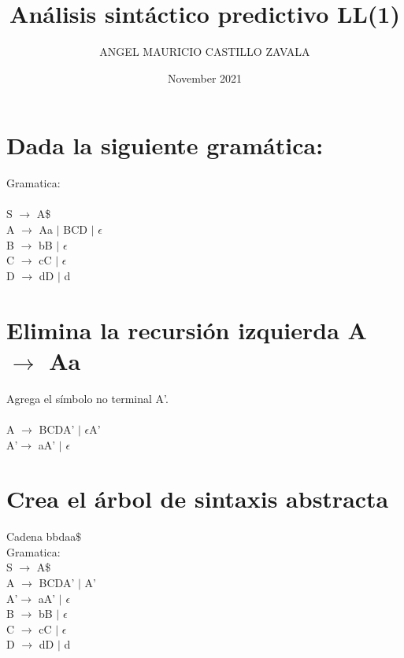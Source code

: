 \documentclass[10pt]{article}
\title{Análisis sintáctico predictivo LL(1)}
\author{ANGEL MAURICIO CASTILLO ZAVALA}
\date{November 2021}
\begin{document}
\maketitle

\section{Dada la siguiente gramática: }
Gramatica: \\\\
    S {$\rightarrow$} A\$ \\
	A {$\rightarrow$}  Aa $\mid$ BCD $\mid$ $\epsilon$ \\
	B {$\rightarrow$} bB $\mid$ $\epsilon$ \\
	C {$\rightarrow$} cC $\mid$ $\epsilon$\\
	D {$\rightarrow$} dD $\mid$ d

\section{Elimina la recursión izquierda A $\rightarrow$ Aa}
Agrega el símbolo no terminal A’.\\\\
           A $\rightarrow$ BCDA' $\mid$ $\epsilon$A'\\
          A’$\rightarrow$ aA' $\mid$ $\epsilon$ \\

\section{Crea el árbol de sintaxis abstracta}    
Cadena bbdaa$\$$\\
Gramatica:\\
S {$\rightarrow$} A\$ \\
A $\rightarrow$ BCDA' $\mid$ A'\\
A’$\rightarrow$ aA' $\mid$ $\epsilon$ \\
B {$\rightarrow$} bB $\mid$ $\epsilon$ \\
C {$\rightarrow$} cC $\mid$ $\epsilon$ \\
D {$\rightarrow$} dD $\mid$ d\\\\
\end{document}
